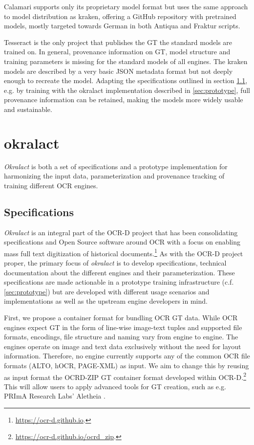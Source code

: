 \documentclass[conference]{IEEEtran}
\begin{document}
Calamari supports only its proprietary model format but uses the same approach
to model distribution as kraken, offering a GitHub repository with pretrained
models, mostly targeted towards German in both Antiqua and Fraktur scripts.


Tesseract is the only project that publishes the GT the standard models are
trained on. In general, provenance information on GT, model structure and training parameters is missing for the standard models of all engines.
The kraken models are described by a very basic JSON metadata format but not
deeply enough to recreate the model. Adapting the specifications outlined
in section \ref{sec:specs}, e.g. by training with the okralact implementation
described in \ref{sec:prototype}, full provenance information can be retained,
making the models more widely usable and sustainable.


\section{okralact}


\textit{Okralact} is both a set of specifications and a prototype
implementation for harmonizing the input data, parameterization and
provenance tracking of training different OCR engines.

\subsection{Specifications}
\label{sec:specs}

\textit{Okralact} is an integral part of the OCR-D project that has been
consolidating specifications and Open Source software around OCR
with a focus on enabling mass full text digitization of historical
documents.\footnote{\url{https://ocr-d.github.io}.} As with the
OCR-D project proper, the primary focus of \textit{okralact} is to develop
specifications, technical documentation about the different engines
and their parameterization. These specifications are made
actionable in a prototype training infrastructure (c.f.
\ref{sec:prototype}) but are developed with different usage
scenarios and implementations as well as the upstream engine
developers in mind.

First, we propose a container format for bundling OCR GT data.
While OCR engines expect GT in the form of line-wise image-text
tuples and supported file formats, encodings, file structure and
naming vary from engine to engine. The engines operate on image and
text data exclusively without the need for layout information.
Therefore, no engine currently supports any of the common OCR file
formats (ALTO, hOCR, PAGE-XML) as input. We aim to change this by
reusing as input format the OCRD-ZIP GT container format developed
within OCR-D.\footnote{\url{https://ocr-d.github.io/ocrd_zip}.}
\cite{boenig2019datech} This will allow users to apply advanced
tools for GT creation, such as e.g.  PRImA Research Labs' Aletheia
\cite{clausner2011aletheia}.
\end{document}
